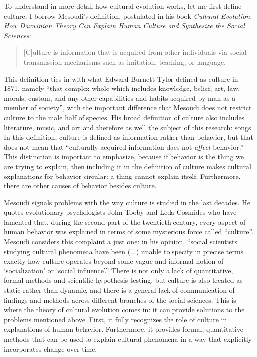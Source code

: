 To understand in more detail how cultural evolution works, let me first define culture. I borrow Mesoudi's definition, postulated in his book \textit{Cultural Evolution. How Darwinian Theory Can Explain Human Culture and Synthesize the Social Sciences}:

\begin{quote}
	[C]ulture is information that is acquired from other individuals via social transmission mechanisms such as imitation, teaching, or language.\autocite[2-3]{mesoudi_cultural_2011}
\end{quote}

\noindent This definition ties in with what Edward Burnett Tylor defined as culture in 1871, namely \enquote{that complex whole which includes knowledge, belief, art, law, morals, custom, and any other capabilities and habits acquired by man as a member of society}\autocite{tylor_primitive_1871}, with the important difference that Mesoudi does not restrict culture to the male half of species. His broad definition of culture also includes literature, music, and art and therefore as well the subject of this research: songs. In this definition, culture is defined as information rather than behavior, but that does not mean that \enquote{culturally acquired information does not \textit{affect} behavior.}\autocite[3]{mesoudi_cultural_2011} This distinction is important to emphasize, because if behavior is the thing we are trying to explain, then including it in the definition of culture makes cultural explanations for behavior circular: a thing cannot explain itself. Furthermore, there are other causes of behavior besides culture.\autocite[4]{mesoudi_cultural_2011}

Mesoudi signals problems with the way culture is studied in the last decades. He quotes evolutionary psychologists John Tooby and Leda Cosmides who have lamented that, during the second part of the twentieth century, every aspect of human behavior was explained in terms of some mysterious force called \enquote{culture}. Mesoudi considers this complaint a just one: in his opinion, \enquote{social scientists studying cultural phenomena have been (...) unable to specify in precise terms exactly how culture operates beyond some vague and informal notion of \enquote*{socialization} or \enquote*{social influence}.}\autocite[18]{mesoudi_cultural_2011} There is not only a lack of quantitative, formal methods and scientific hypothesis testing, but culture is also treated as static rather than dynamic, and there is a general lack of communication of findings and methods across different branches of the social sciences. This is where the theory of cultural evolution comes in: it can provide solutions to the problems mentioned above. First, it fully recognizes the role of culture in explanations of human behavior. Furthermore, it provides formal, quantitative methods that can be used to explain cultural phenomena in a way that explicitly incorporates change over time.\autocite[22-23]{mesoudi_cultural_2011}

